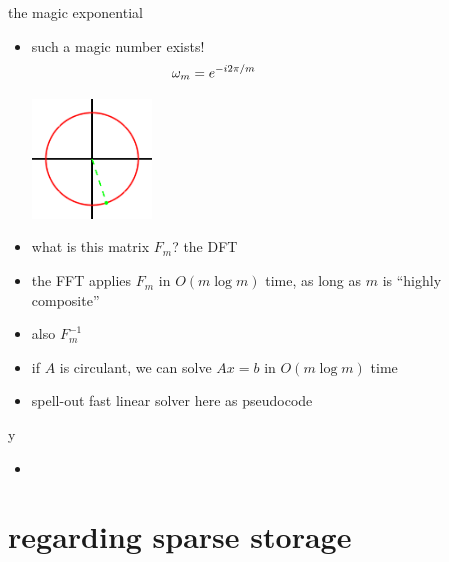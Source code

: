 \documentclass[10pt,
               svgnames,
               hyperref={colorlinks,citecolor=DeepPink4,linkcolor=FireBrick,urlcolor=Maroon},
               usepdftitle=false]{beamer}
\begin{document}
\begin{frame}{the magic exponential}

\begin{itemize}
\item such a magic number exists!
{\large
    $$\omega_m = e^{-i 2\pi/m} \hspace{30mm}$$
}

\vspace{-20mm}
\hfill \includegraphics[width=0.25\textwidth]{images/magic5.png}
\item what is this matrix $F_m$? the DFT
\item the FFT applies $F_m$ in $O(m\log m)$ time, as long as $m$ is ``highly composite''
\item also $F_m^{-1}$
\item if $A$ is circulant, we can solve $Ax=b$ in $O(m\log m)$ time
\item spell-out fast linear solver here as pseudocode
\end{itemize}
\end{frame}


\begin{frame}{y}

\begin{itemize}
\item 
\end{itemize}
\end{frame}


\section{regarding sparse storage}
\end{document}
